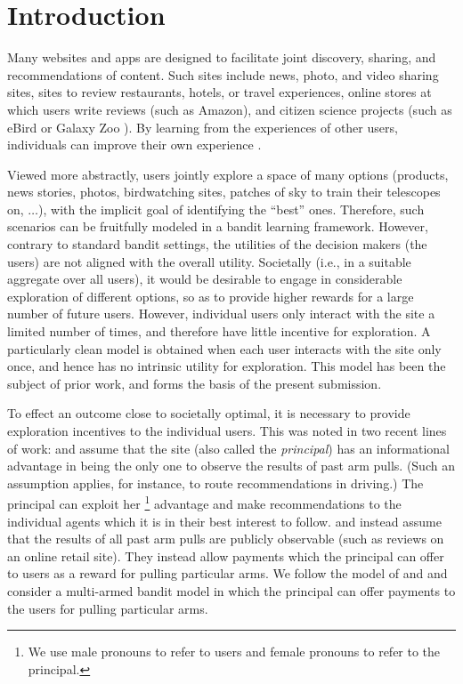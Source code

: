 \section{Introduction}

Many websites and apps are designed to facilitate joint discovery,
sharing, and recommendations of content.
Such sites include news, photo, and video sharing sites,
sites to review restaurants, hotels, or travel experiences,
online stores at which users write reviews (such as Amazon),
and citizen science projects
(such as eBird \citep{sullivan2009ebird,xue-ebird} or Galaxy Zoo \citep{lintott-galaxy-zoo}).
By learning from the experiences of other users, individuals can
improve their own experience \citep{schmit2017human}.

Viewed more abstractly, users jointly explore a space of
many options (products, news stories, photos, birdwatching sites,
patches of sky to train their telescopes on, $\ldots$),
with the implicit goal of identifying the ``best'' ones.
Therefore, such scenarios can be fruitfully modeled in a bandit
learning framework.
However, contrary to standard bandit settings, the utilities of the
decision makers (the users) are not aligned with the overall utility.
Societally (i.e., in a suitable aggregate over all users),
it would be desirable to engage in considerable exploration of
different options, so as to provide higher rewards for a large number
of future users.
However, individual users only interact with the site a limited number
of times, and therefore have little incentive for exploration.
A particularly clean model is obtained when each user interacts with the
site only once, and hence has no intrinsic utility for exploration. 
This model has been the subject of prior work, and forms the basis of
the present submission.

To effect an outcome close to societally optimal,
it is necessary to provide exploration incentives to the individual users.
This was noted in two recent lines of work:
\citet{kremer2014implementing}
and \citet{mansour2015bayesian,mansour2016bayesian}
assume that the site (also called the \emph{principal}) has an
informational advantage in being the only one to observe the results
of past arm pulls.
(Such an assumption applies, for instance, to route recommendations in
driving.)
The principal can exploit her%
\footnote{We use male pronouns to refer to users and female pronouns
  to refer to the principal.}
advantage and make recommendations to the individual agents which it
is in their best interest to follow.
\citet{frazier2014incentivizing} and 
\citet{han2015incentivizing} instead assume that the results of all
past arm pulls are publicly observable
(such as reviews on an online retail site).
They instead allow payments which the principal can offer to users as
a reward for pulling particular arms.
We follow the model of \citet{frazier2014incentivizing} and
\citet{han2015incentivizing} 
and consider a multi-armed bandit model in which the principal can
offer payments to the users for pulling particular arms.

